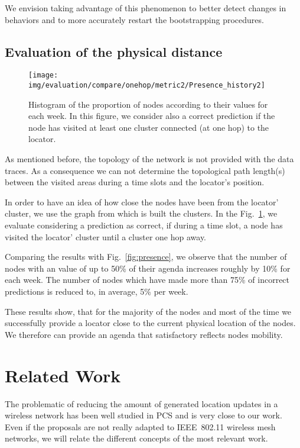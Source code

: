 \documentclass[a4paper]{sig-alternate-10pt}
\begin{document}
We envision taking advantage of  this phenomenon to better detect
changes in behaviors and to more accurately restart the
bootstrapping procedures.

\subsection{Evaluation of the physical distance}
\begin{figure}
\texttt{[image: img/evaluation/compare/onehop/metric2/Presence\_history2]}
\caption{Histogram of the proportion of nodes according to their
 values for each week. In this figure, we consider also a correct
prediction if the node has visited at least one cluster connected
(at one hop) to the locator.} \label{fig:compare_onehop}
\end{figure}

As mentioned before, the topology of the network is not provided
with the data traces. As a consequence we can not determine the
topological path length(s) between the visited areas during a time
slots and the locator's position.

In order to have an idea of how close the nodes have been from the 
locator' cluster, we use the graph from which is built the clusters. 
In the Fig.~\ref {fig:compare_onehop}, we evaluate  considering 
a prediction as correct, if during a time slot, a node has visited the 
locator' cluster until a cluster one hop away.

Comparing the results with Fig.~\ref{fig:presence}, we observe that
the number of nodes with an  value of up to 50\% of
their agenda increases roughly by 10\% for each week. The number of
nodes  which have made more than 75\% of incorrect predictions
is reduced to, in average, 5\% per week.

These results show, that for the majority of the nodes and
most  of the time we successfully provide a locator close to the
current physical location of the nodes. We therefore can provide an
agenda that satisfactory reflects nodes  mobility.


\section{Related Work}
\label{sec:relatedwork}

The problematic of reducing the amount of generated location updates
in a wireless network has been well studied in \textsc{PCS} and is
very close to our work. Even if the proposals are not really adapted
to IEEE~802.11 wireless mesh networks, we will relate the different
concepts of the most relevant work.
\end{document}
